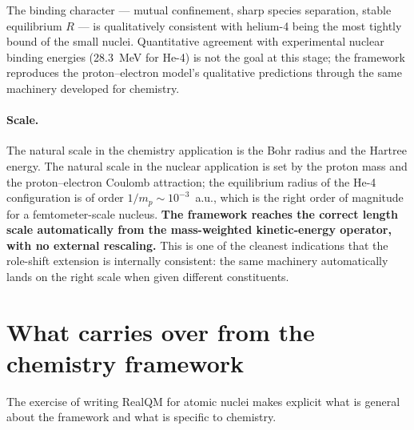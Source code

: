 The binding character --- mutual confinement, sharp species separation, stable equilibrium $R$ --- is qualitatively consistent with helium-4 being the most tightly bound of the small nuclei. Quantitative agreement with experimental nuclear binding energies (28.3~MeV for He-4) is not the goal at this stage; the framework reproduces the proton--electron model's qualitative predictions through the same machinery developed for chemistry.

\paragraph{Scale.} The natural scale in the chemistry application is the Bohr radius and the Hartree energy. The natural scale in the nuclear application is set by the proton mass and the proton--electron Coulomb attraction; the equilibrium radius of the He-4 configuration is of order $1/m_p \sim 10^{-3}$~a.u., which is the right order of magnitude for a femtometer-scale nucleus. \textbf{The framework reaches the correct length scale automatically from the mass-weighted kinetic-energy operator, with no external rescaling.} This is one of the cleanest indications that the role-shift extension is internally consistent: the same machinery automatically lands on the right scale when given different constituents.

\section{What carries over from the chemistry framework}\label{sec:nuc-carryover-natural}

The exercise of writing RealQM for atomic nuclei makes explicit what is general about the framework and what is specific to chemistry.

